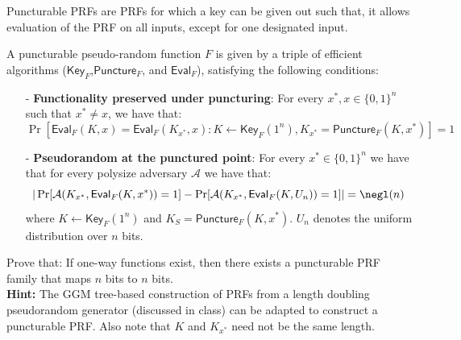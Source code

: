 \documentclass[12pt]{tufte-book}
\begin{document}
\begin{exercise} Puncturable PRFs are PRFs for which a key can be given out such that, it allows evaluation of the PRF on all inputs, except for one designated input.

    \newcommand{\A}{\mathcal{A}}
    \newcommand{\F}{F}
    \newcommand{\KeyF}{\mathsf{Key}_{\F}}
    \newcommand{\PunctureF}{\mathsf{Puncture}_{\F}}
    \newcommand{\EvalF}{\mathsf{Eval}_{\F}}


    A puncturable pseudo-random function $\F$ is given by a triple of efficient algorithms ($\KeyF$,$\PunctureF$, and $\EvalF$), satisfying the following conditions:
    \begin{itemize}
        \item[-] \textbf{Functionality preserved under puncturing}: For every $x^*, x \in \{0,1\}^{n}$ such that $x^* \neq x$, we have that:
              $$\Pr[\EvalF(K,x) = \EvalF(K_{x^*},x) : K \gets \KeyF(1^n), K_{x^*} = \PunctureF(K,x^*)] = 1$$
        \item[-] \textbf{Pseudorandom at the punctured point}: For every $x^*\in \{0,1\}^n$ we have that for every polysize adversary $\A$ we have that:
              $$|\Pr[\A(K_{x^*}, \EvalF(K,x^*)) = 1] - \Pr[\A(K_{x^*}, \EvalF(K,U_n)) = 1]|= \negl(n)$$
              where $K \gets \KeyF(1^n)$ and $K_S = \PunctureF(K,x^*)$. $U_n$ denotes the uniform distribution over $n$ bits.
    \end{itemize}

    Prove that: If one-way functions exist, then there exists a puncturable PRF family that maps $n$ bits to $n$ bits. \\
    \textbf{Hint:} The GGM tree-based construction of PRFs from a length doubling pseudorandom generator (discussed in class) can be adapted to construct a puncturable PRF. Also note that $K$ and $K_{x^*}$ need not be the same length.
\end{exercise}
%
%
\end{document}
